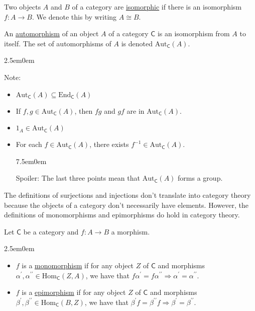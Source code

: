 \documentclass{book}
\newcommand{\hTwo}{%
   \color{MidnightBlue}%
   \fontsize{13}{15}\selectfont%
}
\newcommand{\hFour}{%
   \color{Cerulean}
   \fontsize{12}{14}\selectfont%
}
\newenvironment{myIndent}{%
   \begin{adjustwidth}{2.5em}{0em}%
}{%
   \end{adjustwidth}%
}
\newenvironment{myTindent}{%
   \begin{adjustwidth}{7.5em}{0em}%
}{%
   \end{adjustwidth}%
}
\newcommand{\udefine}[1]{{%
   \setulcolor{Red}%
   \setul{0.14em}{0.07em}%
   \ul{#1}%
}}
\newcommand{\pprime}{{\prime\prime}}
\newcommand{\myHom}{\mathrm{Hom}}
\newcommand{\myEnd}{\mathrm{End}}
\newcommand{\myAut}{\mathrm{Aut}}
\newcommand{\mcateg}[1]{{\bm{\mathsf{#1}}}}
\newcommand{\retTwo}{\hfill\bigbreak}
\begin{document}
Two objects $A$ and $B$ of a category are \udefine{isomorphic} if there is an isomorphism\\ $f: A \longrightarrow B$. We denote this by writing $A \cong B$.\retTwo

An \udefine{automorphism} of an object $A$ of a category $\mcateg{C}$ is an isomorphism from $A$ to itself. The set of automorphisms of $A$ is denoted $\myAut_\mcateg{C}(A)$.
\begin{myIndent}
   \hTwo
   Note:
   \begin{itemize}
      \item $\myAut_\mcateg{C}(A) \subseteq \myEnd_\mcateg{C}(A)$
      \item If $f, g \in \myAut_\mcateg{C}(A)$, then $fg$ and $gf$ are in $\myAut_\mcateg{C}(A)$.
      \item $1_A \in \myAut_\mcateg{C}(A)$
      \item For each $f \in \myAut_\mcateg{C}(A)$, there exists $f^{-1} \in \myAut_\mcateg{C}(A)$.
      
      {\begin{myTindent}\hFour
         Spoiler: The last three points mean that $\myAut_\mcateg{C}(A)$ forms a group.\retTwo
      \end{myTindent}}
   \end{itemize}
\end{myIndent}

The definitions of surjections and injections don't translate into category theory\\ because the objects of a category don't necessarily have elements. However, the\\ definitions of monomorphisms and epimorphisms do hold in category theory.\retTwo

Let $\mcateg{C}$ be a category and $f: A \rightarrow B$ a morphism.
\begin{myIndent}
   \begin{itemize}
      \item $f$ is a \udefine{monomorphism} if for any object $Z$ of $\mcateg{C}$ and morphisms\\ $\alpha^\prime, \alpha^\pprime \in \myHom_\mcateg{C}(Z, A)$, we have that $f\alpha^\prime = f\alpha^\pprime \Longrightarrow \alpha^\prime = \alpha^\pprime$.\retTwo
      
      \item $f$ is a \udefine{epimorphism} if for any object $Z$ of $\mcateg{C}$ and morphisms\\ $\beta^\prime, \beta^\pprime \in \myHom_\mcateg{C}(B, Z)$, we have that $\beta^\prime f = \beta^\pprime f \Longrightarrow \beta^\prime = \beta^\pprime$.\retTwo
   \end{itemize}
\end{myIndent}
\end{document}
